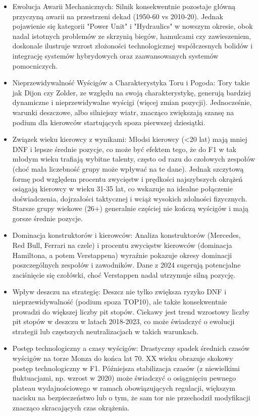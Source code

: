 \documentclass[a4paper,12pt]{article}
\begin{document}
\begin{itemize}
  \item Ewolucja Awarii Mechanicznych: Silnik konsekwentnie pozostaje główną przyczyną awarii na przestrzeni dekad (1950-60 vs 2010-20). Jednak pojawienie się kategorii "Power Unit" i "Hydraulics" w nowszym okresie, obok nadal istotnych problemów ze skrzynią biegów, hamulcami czy zawieszeniem, doskonale ilustruje wzrost złożoności technologicznej współczesnych bolidów i integrację systemów hybrydowych oraz zaawansowanych systemów pomocniczych.
  \item Nieprzewidywalność Wyścigów a Charakterystyka Toru i Pogoda: Tory takie jak Dijon czy Zolder, ze względu na swoją charakterystykę, generują bardziej dynamiczne i nieprzewidywalne wyścigi (więcej zmian pozycji). Jednocześnie, warunki deszczowe, albo silniejszy wiatr, znacząco zwiększają szansę na podium dla kierowców startujących spoza pierwszej dziesiątki.
  \item Związek wieku kierowcy z wynikami: Młodsi kierowcy (<20 lat) mają mniej DNF i lepsze średnie pozycje, co może być efektem tego, że do F1 w tak młodym wieku trafiają wybitne talenty, często od razu do czołowych zespołów (choć mała liczebność grupy może wpływać na te dane). Jednak szczytową formę pod względem procentu zwycięstw i prędkości najszybszych okrążeń osiągają kierowcy w wieku 31-35 lat, co wskazuje na idealne połączenie doświadczenia, dojrzałości taktycznej i wciąż wysokich zdolności fizycznych. Starsze grupy wiekowe (26+) generalnie częściej nie kończą wyścigów i mają gorsze średnie pozycje.
  \item Dominacja konstruktorów i kierowców: Analiza konstruktorów (Mercedes, Red Bull, Ferrari na czele) i procentu zwycięstw kierowców (dominacja Hamiltona, a potem Verstappena) wyraźnie pokazuje okresy dominacji poszczególnych zespołów i zawodników. Dane z 2024 sugerują potencjalne zaciśnięcie się czołówki, choć Verstappen nadal utrzymuje silną pozycję.
  \item Wpływ deszczu na strategię: Deszcz nie tylko zwiększa ryzyko DNF i nieprzewidywalność (podium spoza TOP10), ale także konsekwentnie prowadzi do większej liczby pit stopów. Ciekawy jest trend wzrostowy liczby pit stopów w deszczu w latach 2018-2023, co może świadczyć o ewolucji strategii lub częstszych neutralizacjach w takich warunkach.
  \item Postęp technologiczny a czasy wyścigów: Drastyczny spadek średnich czasów wyścigów na torze Monza do końca lat 70. XX wieku obrazuje skokowy postęp technologiczny w F1. Późniejsza stabilizacja czasów (z niewielkimi fluktuacjami, np. wzrost w 2020) może świadczyć o osiągnięciu pewnego plateau wydajnościowego w ramach obowiązujących regulacji, większym nacisku na bezpieczeństwo lub o tym, że sam tor nie przechodził modyfikacji znacząco skracających czas okrążenia.
\end{itemize}
\end{document}
